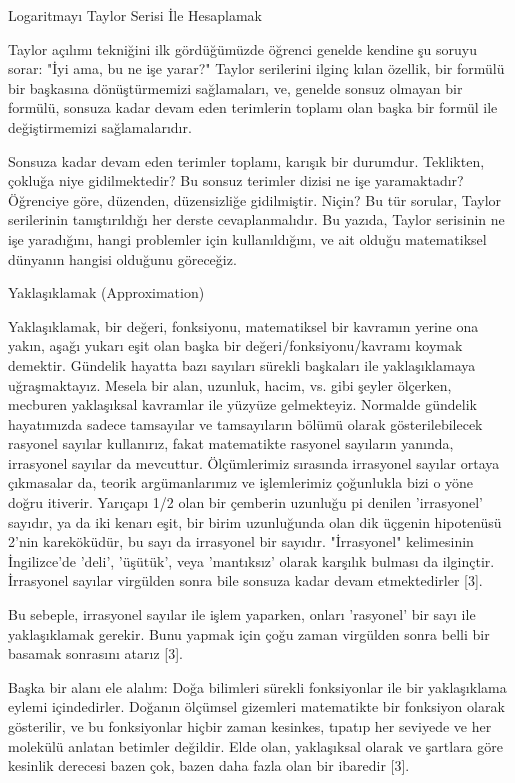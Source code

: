 \documentclass[12pt,fleqn]{article}\usepackage{../../common}
\begin{document}
Logaritmayı Taylor Serisi İle Hesaplamak

Taylor açılımı tekniğini ilk gördüğümüzde öğrenci genelde kendine şu soruyu
sorar: "İyi ama, bu ne işe yarar?" Taylor serilerini ilginç kılan özellik,
bir formülü bir başkasına dönüştürmemizi sağlamaları, ve, genelde sonsuz
olmayan bir formülü, sonsuza kadar devam eden terimlerin toplamı olan başka
bir formül ile değiştirmemizi sağlamalarıdır.

Sonsuza kadar devam eden terimler toplamı, karışık bir durumdur. Teklikten,
çokluğa niye gidilmektedir? Bu sonsuz terimler dizisi ne işe yaramaktadır?
Öğrenciye göre, düzenden, düzensizliğe gidilmiştir. Niçin? Bu tür sorular,
Taylor serilerinin tanıştırıldığı her derste cevaplanmalıdır. Bu yazıda,
Taylor serisinin ne işe yaradığını, hangi problemler için kullanıldığını,
ve ait olduğu matematiksel dünyanın hangisi olduğunu göreceğiz.

Yaklaşıklamak (Approximation)

Yaklaşıklamak, bir değeri, fonksiyonu, matematiksel bir kavramın yerine ona
yakın, aşağı yukarı eşit olan başka bir değeri/fonksiyonu/kavramı koymak
demektir. Gündelik hayatta bazı sayıları sürekli başkaları ile
yaklaşıklamaya uğraşmaktayız. Mesela bir alan, uzunluk, hacim, vs. gibi
şeyler ölçerken, mecburen yaklaşıksal kavramlar ile yüzyüze
gelmekteyiz. Normalde gündelik hayatımızda sadece tamsayılar ve
tamsayıların bölümü olarak gösterilebilecek rasyonel sayılar kullanırız,
fakat matematikte rasyonel sayıların yanında, irrasyonel sayılar da
mevcuttur. Ölçümlerimiz sırasında irrasyonel sayılar ortaya çıkmasalar da,
teorik argümanlarımız ve işlemlerimiz çoğunlukla bizi o yöne doğru
itiverir. Yarıçapı 1/2 olan bir çemberin uzunluğu pi denilen 'irrasyonel'
sayıdır, ya da iki kenarı eşit, bir birim uzunluğunda olan dik üçgenin
hipotenüsü 2'nin kareköküdür, bu sayı da irrasyonel bir
sayıdır. "İrrasyonel" kelimesinin İngilizce'de 'deli', 'üşütük', veya
'mantıksız' olarak karşılık bulması da ilginçtir. İrrasyonel sayılar
virgülden sonra bile sonsuza kadar devam etmektedirler [3].

Bu sebeple, irrasyonel sayılar ile işlem yaparken, onları 'rasyonel' bir
sayı ile yaklaşıklamak gerekir. Bunu yapmak için çoğu zaman virgülden sonra
belli bir basamak sonrasını atarız [3].

Başka bir alanı ele alalım: Doğa bilimleri sürekli fonksiyonlar ile bir
yaklaşıklama eylemi içindedirler. Doğanın ölçümsel gizemleri matematikte
bir fonksiyon olarak gösterilir, ve bu fonksiyonlar hiçbir zaman kesinkes,
tıpatıp her seviyede ve her molekülü anlatan betimler değildir. Elde olan,
yaklaşıksal olarak ve şartlara göre kesinlik derecesi bazen çok, bazen daha
fazla olan bir ibaredir [3].
\end{document}
